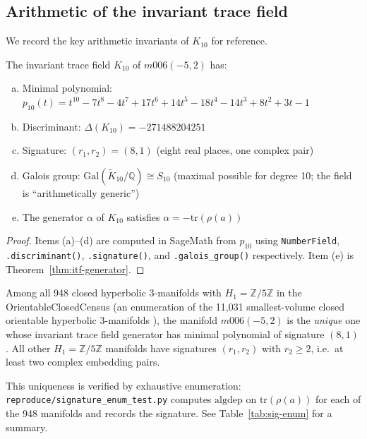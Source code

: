 \subsection{Arithmetic of the invariant trace field}
\label{subsec:itf-arithmetic}

We record the key arithmetic invariants of $K_{10}$ for reference.

\begin{proposition}
\label{prop:K10-arithmetic}
The invariant trace field $K_{10}$ of $m006(-5,2)$ has:
\begin{enumerate}[(a)]
  \item Minimal polynomial:
    $p_{10}(t) = t^{10} - 7t^8 - 4t^7 + 17t^6 + 14t^5 - 18t^4 - 14t^3 + 8t^2 + 3t - 1$
  \item Discriminant: $\Delta(K_{10}) = -271488204251$
  \item Signature: $(r_1, r_2) = (8, 1)$ (eight real places, one complex pair)
  \item Galois group: $\mathrm{Gal}(\widetilde{K}_{10}/\mathbb{Q}) \cong S_{10}$
        (maximal possible for degree 10; the field is ``arithmetically generic'')
  \item The generator $\alpha$ of $K_{10}$ satisfies $\alpha = -\mathrm{tr}(\rho(a))$
\end{enumerate}
\end{proposition}

\begin{proof}
Items (a)--(d) are computed in SageMath from $p_{10}$ using
\texttt{NumberField}, \texttt{.discriminant()}, \texttt{.signature()},
and \texttt{.galois\_group()} respectively.
Item (e) is Theorem~\ref{thm:itf-generator}.
\end{proof}

\begin{remark}
\label{rem:uniqueness}
Among all 948 closed hyperbolic 3-manifolds with $H_1 = \mathbb{Z}/5\mathbb{Z}$
in the OrientableClosedCensus (an enumeration of the 11,031 smallest-volume
closed orientable hyperbolic 3-manifolds \cite{snappy}), the manifold
$m006(-5,2)$ is the \emph{unique} one whose invariant trace field generator
has minimal polynomial of signature $(8,1)$. All other $H_1 = \mathbb{Z}/5\mathbb{Z}$
manifolds have signatures $(r_1, r_2)$ with $r_2 \geq 2$, i.e.\ at least
two complex embedding pairs.

This uniqueness is verified by exhaustive enumeration:
\texttt{reproduce/signature\_enum\_test.py} computes $\mathrm{algdep}$
on $\mathrm{tr}(\rho(a))$ for each of the 948 manifolds and records
the signature. See Table~\ref{tab:sig-enum} for a summary.
\end{remark}

